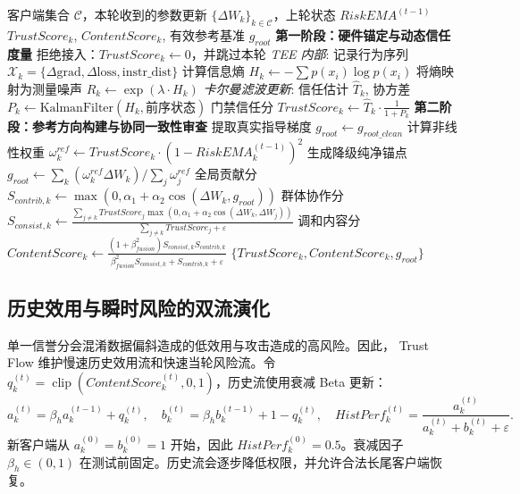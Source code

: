 \documentclass[11pt, a4paper, UTF8, fontset=fandol]{ctexart}
\begin{document}
\begin{algorithm}[htbp]
    \caption{基于 TEE 硬件锚点与纯净参考的准入与内容审查}
    \label{alg:phase12}
    \begin{algorithmic}[1]
        \REQUIRE 客户端集合 $\mathcal{C}$，本轮收到的参数更新 $\{\Delta W_k\}_{k\in\mathcal{C}}$，上轮状态 $RiskEMA^{(t-1)}$
        \ENSURE $TrustScore_k$, $ContentScore_k$, 有效参考基准 $g_{root}$
        \STATE \textbf{第一阶段：硬件锚定与动态信任度量}
        \STATE 拒绝接入：$TrustScore_k \leftarrow 0$，并跳过本轮
        \ELSE
        \STATE \textit{TEE 内部}: 记录行为序列 $\mathcal{X}_k = \{ \Delta \text{grad}, \Delta \text{loss}, \text{instr\_dist} \}$
        \STATE 计算信息熵 $H_k \leftarrow -\sum p(x_i) \log p(x_i)$
        \STATE 将熵映射为测量噪声 $R_k \leftarrow \exp(\lambda \cdot H_k)$
        \STATE \textit{卡尔曼滤波更新}:
        \STATE 信任估计 $\hat{T}_k$, 协方差 $P_k \leftarrow \mathrm{KalmanFilter}(H_k, \text{前序状态})$
        \STATE 门禁信任分 $TrustScore_k \leftarrow \hat{T}_k \cdot \frac{1}{1 + P_k}$
        \ENDIF
        \ENDFOR
        \STATE \textbf{第二阶段：参考方向构建与协同一致性审查}
        \STATE 提取真实指导梯度 $g_{root} \leftarrow g_{root\_clean}$
        \ELSE
        \STATE 计算非线性权重 $\omega_k^{ref} \leftarrow TrustScore_k \cdot (1 - RiskEMA_k^{(t-1)})^2$
        \STATE 生成降级纯净锚点 $g_{root} \leftarrow \sum_k (\omega_k^{ref} \Delta W_k) / \sum_j \omega_j^{ref}$
        \ENDIF
        \STATE 全局贡献分 $S_{contrib,k} \leftarrow \max(0, \alpha_1 + \alpha_2 \cos(\Delta W_k, g_{root}))$
        \STATE 群体协作分 $S_{consist,k} \leftarrow \frac{\sum_{j \neq k} TrustScore_j \max(0, \alpha_1 + \alpha_2 \cos(\Delta W_k, \Delta W_j))}{\sum_{j \neq k} TrustScore_j + \varepsilon}$
        \STATE 调和内容分 $ContentScore_k \leftarrow \frac{(1+\beta_{fusion}^2)S_{consist,k} S_{contrib,k}}{\beta_{fusion}^2 S_{consist,k} + S_{contrib,k} + \varepsilon}$
        \ENDFOR
        \RETURN $\{TrustScore_k, ContentScore_k, g_{root}\}$
    \end{algorithmic}
\end{algorithm}


\subsection{历史效用与瞬时风险的双流演化}
单一信誉分会混淆数据偏斜造成的低效用与攻击造成的高风险。因此，
Trust Flow 维护慢速历史效用流和快速当轮风险流。令
$q_k^{(t)}=\operatorname{clip}(ContentScore_k^{(t)},0,1)$，历史流使用衰减
Beta 更新：
\begin{equation}
    a_k^{(t)}=\beta_h a_k^{(t-1)}+q_k^{(t)},\quad
    b_k^{(t)}=\beta_h b_k^{(t-1)}+1-q_k^{(t)},\quad
    HistPerf_k^{(t)}=\frac{a_k^{(t)}}{a_k^{(t)}+b_k^{(t)}+\varepsilon}.
\end{equation}
新客户端从 $a_k^{(0)}=b_k^{(0)}=1$ 开始，因此
$HistPerf_k^{(0)}=0.5$。衰减因子 $\beta_h\in(0,1)$ 在测试前固定。历史流会逐步降低权限，并允许合法长尾客户端恢复。
\end{document}
